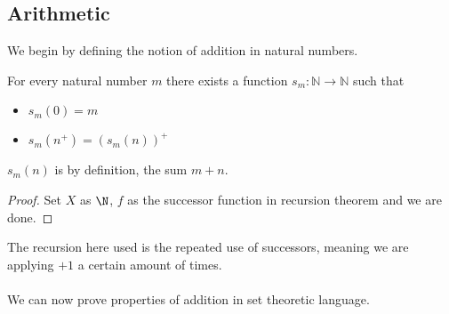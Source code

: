 \documentclass[a4paper]{article}
\begin{document}
\subsection{Arithmetic}
We begin by defining the notion of addition in natural numbers. 
\begin{prp}{}{} For every natural number $m$ there exists a function $s_m:\mathbb{N}\to\mathbb{N}$ such that
\begin{itemize}
\item $s_m(0)=m$
\item $s_m(n^+)=(s_m(n))^+$
\end{itemize}
$s_m(n)$ is by definition, the sum $m+n$. \tcbline
\begin{proof}
Set $X$ as $\N$, $f$ as the successor function in recursion theorem and we are done. 
\end{proof}
\end{prp}

The recursion here used is the repeated use of successors, meaning we are applying $+1$ a certain amount of times. \\~\\
We can now prove properties of addition in set theoretic language. 
\end{document}
